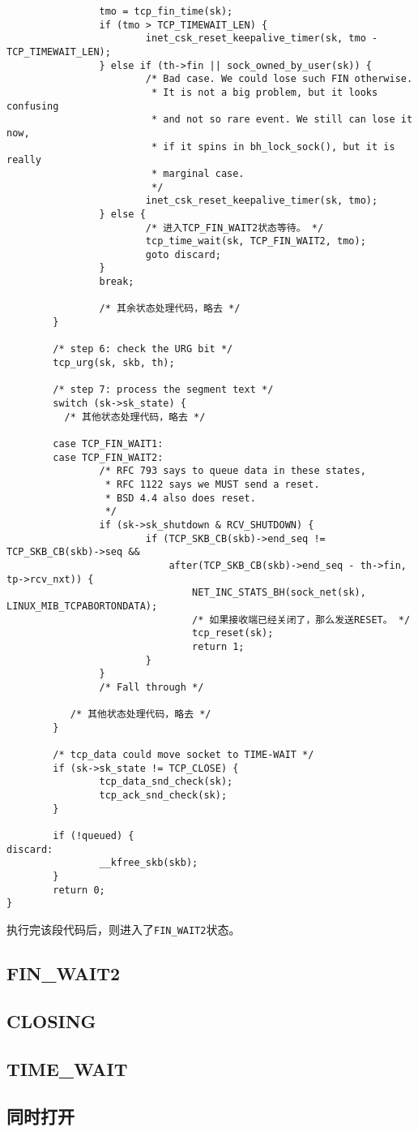 \begin{verbatim}
                tmo = tcp_fin_time(sk);
                if (tmo > TCP_TIMEWAIT_LEN) {
                        inet_csk_reset_keepalive_timer(sk, tmo - TCP_TIMEWAIT_LEN);
                } else if (th->fin || sock_owned_by_user(sk)) {
                        /* Bad case. We could lose such FIN otherwise.
                         * It is not a big problem, but it looks confusing
                         * and not so rare event. We still can lose it now,
                         * if it spins in bh_lock_sock(), but it is really
                         * marginal case.
                         */
                        inet_csk_reset_keepalive_timer(sk, tmo);
                } else {
                        /* 进入TCP_FIN_WAIT2状态等待。 */
                        tcp_time_wait(sk, TCP_FIN_WAIT2, tmo);
                        goto discard;
                }
                break;

                /* 其余状态处理代码，略去 */
        }

        /* step 6: check the URG bit */
        tcp_urg(sk, skb, th);

        /* step 7: process the segment text */
        switch (sk->sk_state) {
          /* 其他状态处理代码，略去 */

        case TCP_FIN_WAIT1:
        case TCP_FIN_WAIT2:
                /* RFC 793 says to queue data in these states,
                 * RFC 1122 says we MUST send a reset.
                 * BSD 4.4 also does reset.
                 */
                if (sk->sk_shutdown & RCV_SHUTDOWN) {
                        if (TCP_SKB_CB(skb)->end_seq != TCP_SKB_CB(skb)->seq &&
                            after(TCP_SKB_CB(skb)->end_seq - th->fin, tp->rcv_nxt)) {
                                NET_INC_STATS_BH(sock_net(sk), LINUX_MIB_TCPABORTONDATA);
                                /* 如果接收端已经关闭了，那么发送RESET。 */
                                tcp_reset(sk);
                                return 1;
                        }
                }
                /* Fall through */

           /* 其他状态处理代码，略去 */
        }

        /* tcp_data could move socket to TIME-WAIT */
        if (sk->sk_state != TCP_CLOSE) {
                tcp_data_snd_check(sk);
                tcp_ack_snd_check(sk);
        }

        if (!queued) {
discard:
                __kfree_skb(skb);
        }
        return 0;
}
\end{verbatim}
执行完该段代码后，则进入了\texttt{FIN_WAIT2}状态。

\subsection{FIN\_WAIT2}

\subsection{CLOSING}

\subsection{TIME\_WAIT}

\subsection{同时打开}
\label{subsec:fin_at_same_time}
